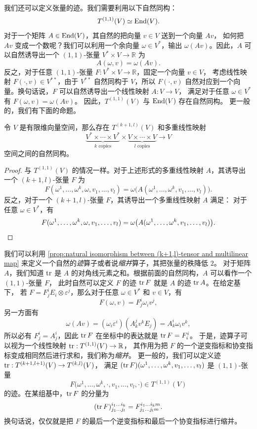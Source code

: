 我们还可以定义张量的迹。我们需要利用以下自然同构：
\[
  T^{(1,1)}(V)\simeq \operatorname{End}(V).
\]
对于一个矩阵 $A\in\operatorname{End}(V)$，其自然的把向量 $v\in V$ 送到一个向量 $Av$，
如何把 $Av$ 变成一个数呢？我们可以利用一个余向量 $\omega\in V^*$，输出
$\omega(Av)$。因此，$A$ 可以自然诱导出一个 $(1,1)$-张量 $V^*\times V\to \mathbb{R}$
为
\[
  A(\omega,v)=\omega(Av).
\]
反之，对于任意 $(1,1)$-张量 $F:V^*\times V\to \mathbb{R}$，固定一个向量 $v\in V$，
考虑线性映射 $F(\cdot,v)\in V^{**}$，由于 $V^{**}$ 自然同构于 $V$，所以 $F(\cdot,v)$
自然对应到一个向量。换句话说，$F$ 可以自然诱导出一个线性映射 $A:V\to V$，
满足对于任意 $\omega\in V^*$ 有 $F(\omega,v)=\omega(Av)$。
因此，$T^{(1,1)}(V)$ 与 $\operatorname{End}(V)$ 存在自然同构。
更一般的，我们有下面的命题。

\begin{proposition}\label{prop:natural isomorphism between (k+1,l)-tensor and multilinear map}
  令 $V$ 是有限维向量空间，那么存在 $T^{(k+1,l)}(V)$ 和多重线性映射
  \[
    \underbrace{V^*\times\cdots\times V^*}_{\text{$k$ copies}}
    \times \underbrace{V\times\cdots\times V}_{\text{$l$ copies}}\to V
  \]
  空间之间的自然同构。
\end{proposition}
\begin{proof}
  与 $T^{(1,1)}(V)$ 的情况一样。对于上述形式的多重线性映射 $A$，其诱导出
  一个 $(k+1,l)$-张量 $F$ 为
  \[
    F(\omega^1,\dots,\omega^k,\omega,v_1,\dots,v_l)=
    \omega\bigl(A(\omega^1,\dots,\omega^k,v_1,\dots,v_l)\bigr).
  \]
  反之，对于一个 $(k+1,l)$-张量 $F$，其诱导出一个多重线性映射 $A$ 满足：
  对于任意 $\omega\in V^*$，有
  \[
    F(\omega^1,\dots,\omega^k,\omega,v_1,\dots,v_l)=
    \omega\bigl(A(\omega^1,\dots,\omega^k,v_1,\dots,v_l)\bigr).\qedhere
  \]
\end{proof}

我们可以利用 \autoref{prop:natural isomorphism between (k+1,l)-tensor and multilinear map}
来定义一个自然的\emph{迹}算子或者说\emph{缩并}算子，其把张量的秩降低 $2$。
对于矩阵 $A$，我们知道 $\operatorname{tr}$ 是 $A$ 的对角线元素之和。根据前面的自然同构，$A$ 可以看作一个 $(1,1)$-张量 $F$，
此时自然可以定义 $F$ 的迹 $\operatorname{tr} F$ 就是 $A$ 的迹 $\operatorname{tr} A$。在给定基下，
若 $F=F^i_j E_i\otimes\varepsilon^j$，那么对于任意 $\omega\in V^*$ 和 $v\in V$，有
\[
  F(\omega,v)=F^i_j\omega_iv^j,
\]
另一方面有
\[
  \omega(Av)=(\omega_i\varepsilon^i)(A^j_kv^kE_j)=A^i_k\omega_i v^k,
\]
所以必有 $F^i_j=A^i_j$，因此 $\operatorname{tr} F$ 在坐标中的表达就是 $\operatorname{tr} F= F_i^i$。
于是，迹算子可以视为一个线性映射 $\operatorname{tr}:T^{(1,1)}(V)\to \mathbb{R}$，
其作用为把 $F$ 的一个逆变指标和协变指标变成相同然后进行求和，我们称为\emph{缩并}。
更一般的，我们可以定义迹 $\operatorname{tr}:T^{(k+1,l+1)}(V)\to T^{(k,l)}(V)$，
满足 $(\operatorname{tr} F)(\omega^1,\dots,\omega^k,v_1,\dots,v_l)$
是 $(1,1)$-张量
\[
  F\bigl(\omega^1,\dots,\omega^k,\cdot,v_1,\dots,v_l,\cdot\bigr)
  \in T^{(1,1)}(V)
\]
的迹。在某组基中，$\operatorname{tr} F$ 的分量为
\[
  (\operatorname{tr} F)_{j_1\dots j_l}^{i_1\dots i_k}=
  F_{j_1\dots j_l m}^{i_1\dots i_k m}.
\]
换句话说，仅仅就是把 $F$ 的最后一个逆变指标和最后一个协变指标进行缩并。






